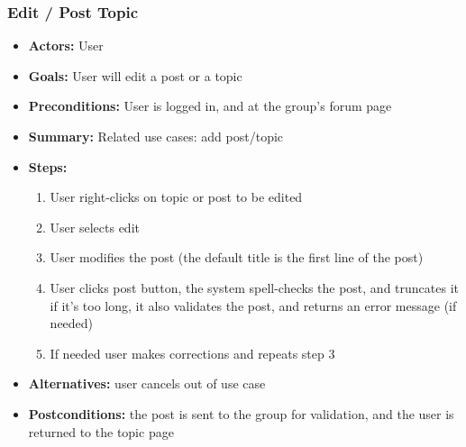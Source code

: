 			\subsubsection{Edit / Post Topic}
			\begin{itemize}
				\item{\textbf{Actors:} User}
				\item{\textbf{Goals:} User will edit a post or a topic}
				\item{\textbf{Preconditions:} User is logged in, and at the group's forum page}
				\item{\textbf{Summary:} Related use cases: add post/topic}
				\item{\textbf{Steps:}
				\begin{enumerate}
					\item{User right-clicks on topic or post to be edited}
					\item{User selects edit}
					\item{User modifies the post (the default title is the first line of the post)}
					\item{User clicks post button, the system spell-checks the post, and truncates it if it's too long, it also validates the post, and returns an error message (if needed)}
					\item{If needed user makes corrections and repeats step 3}
				\end{enumerate}
				}
				\item{\textbf{Alternatives:} user cancels out of use case}
				\item{\textbf{Postconditions:} the post is sent to the group for validation, and the user is returned to the topic page}
			\end{itemize}

